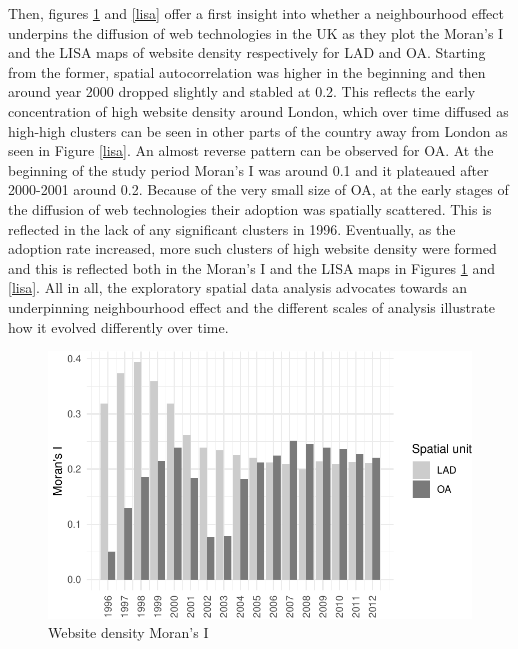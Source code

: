 \documentclass[
  authoryear,
  preprint,
  3p]{elsarticle}
\begin{document}
Then, figures \ref{morani} and \ref{lisa} offer a first insight into
whether a neighbourhood effect underpins the diffusion of web
technologies in the UK as they plot the Moran's I and the LISA maps of
website density respectively for LAD and OA. Starting from the former,
spatial autocorrelation was higher in the beginning and then around year
2000 dropped slightly and stabled at 0.2. This reflects the early
concentration of high website density around London, which over time
diffused as high-high clusters can be seen in other parts of the country
away from London as seen in Figure \ref{lisa}. An almost reverse pattern
can be observed for OA. At the beginning of the study period Moran's I
was around 0.1 and it plateaued after 2000-2001 around 0.2. Because of
the very small size of OA, at the early stages of the diffusion of web
technologies their adoption was spatially scattered. This is reflected
in the lack of any significant clusters in 1996. Eventually, as the
adoption rate increased, more such clusters of high website density were
formed and this is reflected both in the Moran's I and the LISA maps in
Figures \ref{morani} and \ref{lisa}. All in all, the exploratory spatial
data analysis advocates towards an underpinning neighbourhood effect and
the different scales of analysis illustrate how it evolved differently
over time.

\begin{figure}[H]

{\centering \includegraphics[width=1\textwidth,height=\textheight]{tranos2023_files/figure-pdf/morani-1.pdf}

}

\caption{\label{morani}Website density Moran's I}

\end{figure}%
\end{document}

